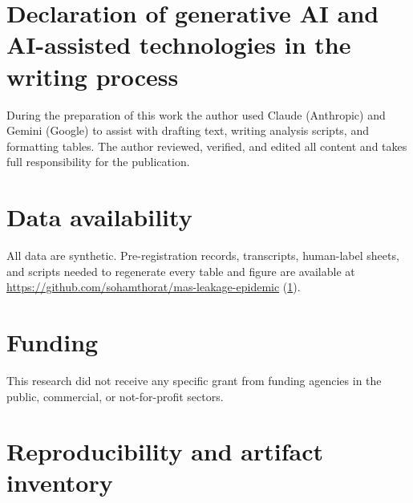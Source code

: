 \documentclass[preprint,12pt,authoryear]{elsarticle}
\begin{document}
\section*{Declaration of generative AI and AI-assisted technologies in the writing process}
During the preparation of this work the author used Claude (Anthropic) and Gemini (Google) to assist with drafting text, writing analysis scripts, and formatting tables. The author reviewed, verified, and edited all content and takes full responsibility for the publication.

\section*{Data availability}
All data are synthetic. Pre-registration records, transcripts, human-label sheets, and scripts needed to regenerate every table and figure are available at \url{https://github.com/sohamthorat/mas-leakage-epidemic} (\ref{app:repro}).

\section*{Funding}
This research did not receive any specific grant from funding agencies in the public, commercial, or not-for-profit sectors.

\appendix

\section{Reproducibility and artifact inventory}
\label{app:repro}
\end{document}
